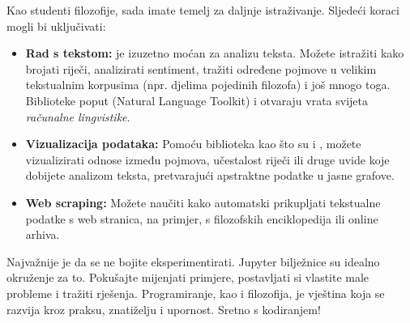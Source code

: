 Kao studenti filozofije, sada imate temelj za daljnje istraživanje. Sljedeći koraci mogli bi uključivati:
\begin{itemize}
    \item \textbf{Rad s tekstom:}  je izuzetno moćan za analizu teksta. Možete istražiti kako brojati riječi, analizirati sentiment, tražiti određene pojmove u velikim tekstualnim korpusima (npr. djelima pojedinih filozofa) i još mnogo toga. Biblioteke poput  (Natural Language Toolkit) i  otvaraju vrata svijeta \textit{računalne lingvistike}.
    \item \textbf{Vizualizacija podataka:} Pomoću biblioteka kao što su  i , možete vizualizirati odnose između pojmova, učestalost riječi ili druge uvide koje dobijete analizom teksta, pretvarajući apstraktne podatke u jasne grafove.
    \item \textbf{Web scraping:} Možete naučiti kako automatski prikupljati tekstualne podatke s web stranica, na primjer, s filozofskih enciklopedija ili online arhiva.
\end{itemize}

Najvažnije je da se ne bojite eksperimentirati. Jupyter bilježnice su idealno okruženje za to. Pokušajte mijenjati primjere, postavljati si vlastite male probleme i tražiti rješenja. Programiranje, kao i filozofija, je vještina koja se razvija kroz praksu, znatiželju i upornost. Sretno s kodiranjem!

